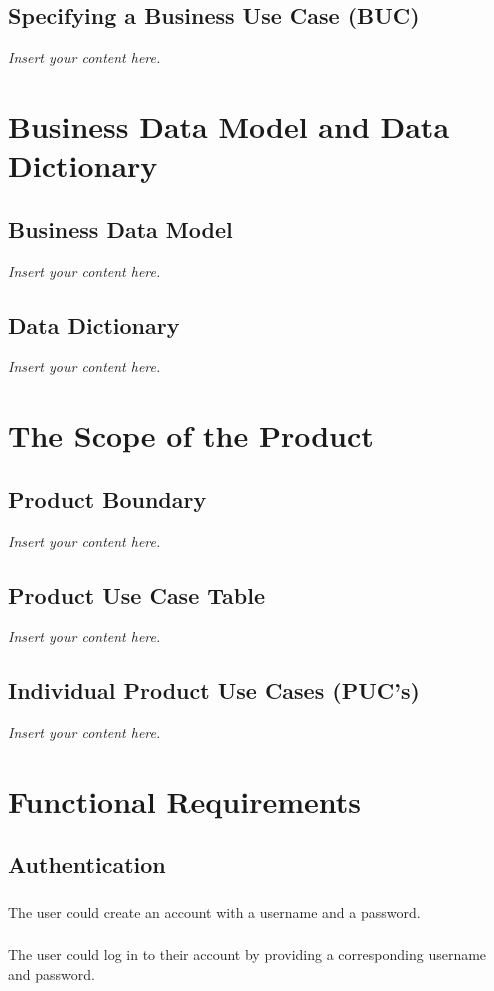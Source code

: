 \documentclass[12pt]{article}
\newcommand{\lips}{\textit{Insert your content here.}}
\begin{document}
\subsection{Specifying a Business Use Case (BUC)}
\lips

\section{Business Data Model and Data Dictionary}
\subsection{Business Data Model}
\lips
\subsection{Data Dictionary}
\lips

\section{The Scope of the Product}
\subsection{Product Boundary}
\lips
\subsection{Product Use Case Table}
\lips
\subsection{Individual Product Use Cases (PUC's)}
\lips

\section{Functional Requirements}
\subsection{Authentication}
\subsubsection{}
The user could create an account with a username and a password.
\subsubsection{}
The user could log in to their account by providing a corresponding username and password.
\end{document}
